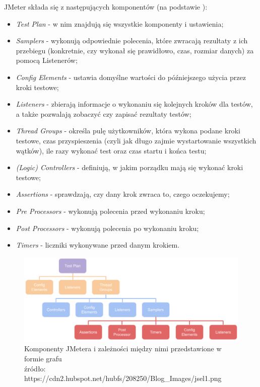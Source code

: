 JMeter składa się z następujących komponentów (na podstawie \cite{comp}):
\begin{itemize}
    \item \textit{Test Plan} - w nim znajdują się wszystkie komponenty i ustawienia;
    \item \textit{Samplers} - wykonują odpowiednie polecenia, które zwracają rezultaty z ich przebiegu (konkretnie, czy wykonał się prawidłowo, czas, rozmiar danych) za pomocą Listenerów;
    \item \textit{Config Elements} - ustawia domyślne wartości do późniejszego użycia przez kroki testowe;
    \item \textit{Listeners} - zbierają informacje o wykonaniu się kolejnych kroków dla testów, a także pozwalają zobaczyć czy zapisać rezultaty testów;
    \item \textit{Thread Groups} - określa pulę użytkowników, która wykona podane kroki testowe, czas przyspieszenia (czyli jak długo zajmie wystartowanie wszystkich wątków), ile razy wykonać test oraz czas startu i końca testu;
    \item \textit{(Logic) Controllers} - definiują, w jakim porządku mają się wykonać kroki testowe;
    \item \textit{Assertions} - sprawdzają, czy dany krok zwraca to, czego oczekujemy;
    \item \textit{Pre Processors} - wykonują polecenia przed wykonaniu kroku;
    \item \textit{Post Processors} - wykonują polecenia po wykonaniu kroku; 
    \item \textit{Timers} - liczniki wykonywane przed danym krokiem.
\end{itemize}

\begin{figure}[H]
\centering
\captionsetup{justification=centering}
\includegraphics[width=1.05\textwidth]{jmeterComp.png}
\caption[Komponenty JMetera i zależności między nimi przedstawione w formie grafu]{\label{fig:ham}Komponenty JMetera i zależności między nimi przedstawione w formie grafu \\ źródło: https://cdn2.hubspot.net/hubfs/208250/Blog\_Images/jsel1.png}
\end{figure}


